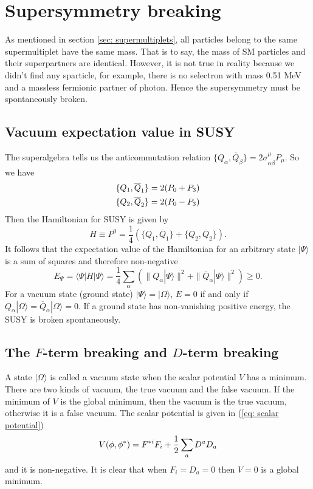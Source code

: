 \documentclass[12pt]{report}
\begin{document}
\chapter{Supersymmetry breaking}

As mentioned in section \ref{sec: supermultiplets}, all particles belong to the same supermultiplet have the same mass.
That is to say, the mass of SM particles and their superpartners are identical.
However, it is not true in reality because we didn't find any sparticle, for example, there is no selectron with mass 0.51 MeV and a massless fermionic partner of photon.
Hence the supersymmetry must be spontaneously broken.



\section{Vacuum expectation value in SUSY}
The superalgebra tells us the anticommutation relation $\{ Q_{\alpha}, \overline{Q}_{\dot{\beta}} \} = 2 \sigma^{\mu}_{\alpha \dot{\beta}} P_{\mu}$.
So we have
\begin{align}
\{ Q_{1}, \overline{Q}_{1} \} = 2 ( P_{0} + P_{3}) \notag \\
\{ Q_{2}, \overline{Q}_{2} \} = 2 ( P_{0} - P_{3}) 
\end{align}
Then the Hamiltonian for SUSY is given by
\begin{equation}
H \equiv P^{0} = \frac{1}{4} (\{ Q_{1}, \overline{Q}_{1} \}  + \{ Q_{2}, \overline{Q}_{2} \} ) .
\end{equation}
It follows that the expectation value of the Hamiltonian for an arbitrary state $| \Psi \rangle$ is a sum of squares and therefore non-negative
\begin{equation}
E_{\Psi} = \langle \Psi | H | \Psi \rangle = \frac{1}{4} \sum_{\alpha} ( \| Q_{\alpha} | \Psi \rangle \|^2 + \| \overline{Q}_{\dot{\alpha}} | \Psi \rangle \|^2 ) \ge 0 .
\end{equation}
For a vacuum state (ground state) $|\Psi \rangle = | \Omega \rangle$, $E = 0$ if and only if $Q_{\alpha} | \Omega \rangle = \overline{Q}_{\dot{\alpha}} | \Omega \rangle = 0$.
If a ground state has non-vanishing positive energy, the SUSY is broken spontaneously. 



\section{The $F$-term breaking and $D$-term breaking}
A state $| \Omega \rangle$ is called a vacuum state when the scalar potential $V$ has a minimum.
There are two kinds of vacuum, the true vacuum and the false vacuum.
If the minimum of $V$ is the global minimum, then the vacuum is the true vacuum, otherwise it is a false vacuum.
The scalar potential is given in (\ref{eq: scalar potential})
\begin{equation}
V(\phi, \phi^{*}) = F^{*i} F_{i} + \frac{1}{2} \sum_{a} D^{a} D_{a} \notag
\end{equation}
and it is non-negative. 
It is clear that when $F_{i} = D_{a} = 0$ then $V = 0$ is a global minimum.
\end{document}
